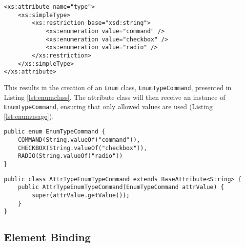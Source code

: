 \bigskip


\begin{minipage}{\linewidth}
\begin{lstlisting}[caption={Enumeration XSD Definition},label={lst:enumxsddefinition}]
<xs:attribute name="type">
    <xs:simpleType>
        <xs:restriction base="xsd:string">
            <xs:enumeration value="command" />
            <xs:enumeration value="checkbox" />
            <xs:enumeration value="radio" />
        </xs:restriction>
    </xs:simpleType>
</xs:attribute>
\end{lstlisting}
\end{minipage}

\noindent
This results in the creation of an \texttt{Enum} class, \texttt{EnumTypeCommand}, presented in Listing \ref{lst:enumclass}. The attribute class will then receive an instance of \texttt{EnumTypeCommand}, ensuring that only allowed values are used (Listing \ref{lst:enumusage}).

\bigskip


\begin{minipage}{\linewidth}
\begin{lstlisting}[caption={Enumeration Class},label={lst:enumclass}]
public enum EnumTypeCommand {
    COMMAND(String.valueOf("command")), 
    CHECKBOX(String.valueOf("checkbox")),
    RADIO(String.valueOf("radio"))
}
\end{lstlisting}
\end{minipage}


\begin{minipage}{\linewidth}
\begin{lstlisting}[caption={Attribute Receiving An Enumeration Instance},label={lst:enumusage}]
public class AttrTypeEnumTypeCommand extends BaseAttribute<String> {
    public AttrTypeEnumTypeCommand(EnumTypeCommand attrValue) {
        super(attrValue.getValue());
    }
}
\end{lstlisting}
\end{minipage}

\newpage

\subsection{Element Binding}
\label{sec:elementbinding}

